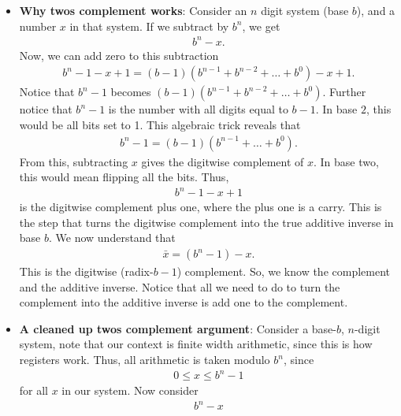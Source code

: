 \documentclass{report}
\begin{document}
\begin{itemize}
        \item \textbf{Why twos complement works}: Consider an $n$ digit system (base $b$), and a number $x$ in that system. If we subtract by $b^{n}$, we get
            \begin{align*}
                b^{n} - x
            .\end{align*}
            Now, we can add zero to this subtraction
            \begin{align*}
                b^{n} - 1 - x + 1 = (b-1)(b^{n-1}+b^{n-2}+\dots+b^{0}) - x + 1
            .\end{align*}
            Notice that $b^{n}-1$ becomes $(b-1)(b^{n-1} + b^{n-2} + \dots + b^{0}) $. Further notice that $b^{n}-1$ is the number with all digits equal to $b-1$. In base $2$, this would be all bits set to 1.
            \bigbreak \noindent 
            This algebraic trick reveals that
            \begin{align*}
                b^{n}-1 = (b - 1)(b^{n-1} + \dots + b^{0})
            .\end{align*}
            From this, subtracting $x$ gives the digitwise complement of $x$. In base two, this would mean flipping all the bits. Thus,
            \begin{align*}
                b^{n}-1 - x + 1
            \end{align*}
            is the digitwise complement plus one, where the plus one is a carry. This is the step that turns the digitwise complement into the true additive inverse in base $b$.  We now understand that
            \begin{align*}
                \bar{x} = (b^{n}-1)-x
            .\end{align*}
            This is the digitwise (radix-$b-1$) complement. So, we know the complement and the additive inverse. Notice that all we need to do to turn the complement into the additive inverse is add one to the complement. 
        \item \textbf{A cleaned up twos complement argument}: 
            Consider a base-$b$, $n$-digit system, note that our context is finite width arithmetic, since this is how registers work. Thus, all arithmetic is taken modulo $b^{n}$, since
            \begin{align*}
                0 \leq x \leq b^{n}-1
            \end{align*}
            for all $x$ in our system. Now consider 
            \begin{align*}
                b^{n}-x

\end{align*}
\end{itemize}
\end{document}

